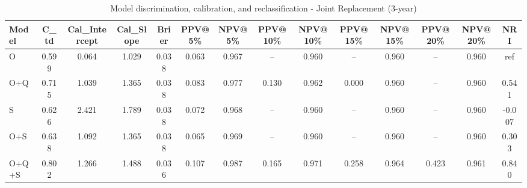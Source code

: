 \begin{table}[htbp]
\centering
\small
\caption{Model discrimination, calibration, and reclassification - Joint Replacement (3-year)}
\label{tab:perf_joint_3y}
\begin{tabular}{lccccccccccccc}
\toprule
Model & C\_td & Cal\_Intercept & Cal\_Slope & Brier & PPV@5\% & NPV@5\% & PPV@10\% & NPV@10\% & PPV@15\% & NPV@15\% & PPV@20\% & NPV@20\% & NRI \\
\midrule
O & 0.599 & 0.064 & 1.029 & 0.038 & 0.063 & 0.967 & -- & 0.960 & -- & 0.960 & -- & 0.960 & ref \\
O+Q & 0.715 & 1.039 & 1.365 & 0.038 & 0.083 & 0.977 & 0.130 & 0.962 & 0.000 & 0.960 & -- & 0.960 & 0.541 \\
S & 0.626 & 2.421 & 1.789 & 0.038 & 0.072 & 0.968 & -- & 0.960 & -- & 0.960 & -- & 0.960 & -0.007 \\
O+S & 0.638 & 1.092 & 1.365 & 0.038 & 0.065 & 0.969 & -- & 0.960 & -- & 0.960 & -- & 0.960 & 0.303 \\
O+Q+S & 0.802 & 1.266 & 1.488 & 0.036 & 0.107 & 0.987 & 0.165 & 0.971 & 0.258 & 0.964 & 0.423 & 0.961 & 0.840 \\
\bottomrule
\end{tabular}
\end{table}